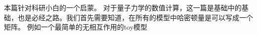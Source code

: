 本篇针对科研小白的一个启蒙。
对于量子力学的数值计算，这一篇是基础中的基础，也是必经之路。我们首先需要知道，在所有的模型中哈密顿量是可以写成一个矩阵。
例如一个最简单的无相互作用的toy模型
\begin{equation}

\end{equation}


